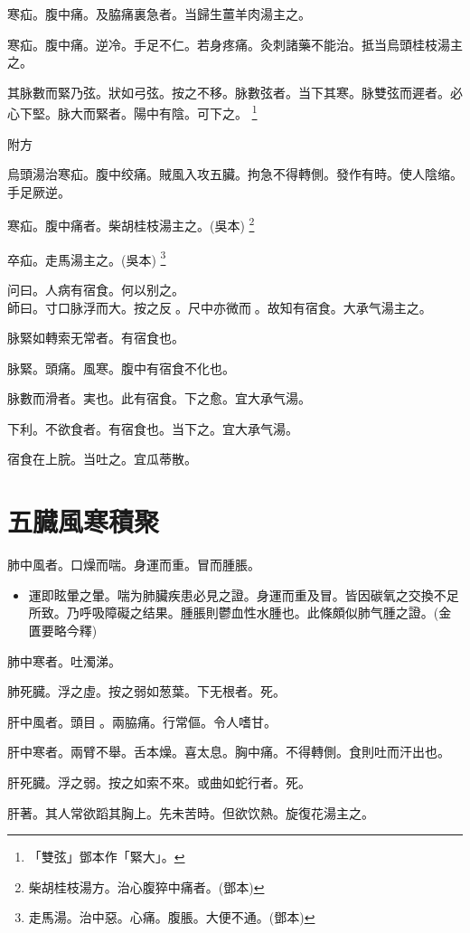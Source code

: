 \documentclass[11pt,oneside,b5paper]{ctexbook}
\begin{document}
\begin{flushleft}
寒疝。腹中痛。及脇痛裏急者。当歸生薑羊肉湯主之。

寒疝。腹中痛。逆冷。手足不仁。若身疼痛。灸刺諸藥不能治。抵当烏頭桂枝湯主之。

其脉數而緊乃弦。狀如弓弦。按之不移。脉數弦者。当下其寒。脉雙弦而遲者。必心下堅。脉大而緊者。陽中有陰。可下之。
\footnote{「雙弦」鄧本作「緊大」。}

附方

烏頭湯治寒疝。腹中绞痛。賊風入攻五臟。拘急不得轉側。發作有時。使人陰缩。手足厥逆。

寒疝。腹中痛者。柴胡桂枝湯主之。(吳本)
\footnote{柴胡桂枝湯方。治心腹猝中痛者。(鄧本)}

卒疝。走馬湯主之。(吳本)
\footnote{走馬湯。治中惡。心痛。腹脹。大便不通。(鄧本)}

问曰。人病有宿食。何以别之。\\
師曰。寸口脉浮而大。按之反{𬈧}。尺中亦微而{𬈧}。故知有宿食。大承气湯主之。

脉緊如轉索无常者。有宿食也。

脉緊。頭痛。風寒。腹中有宿食不化也。

脉數而滑者。実也。此有宿食。下之愈。宜大承气湯。

下利。不欲食者。有宿食也。当下之。宜大承气湯。

宿食在上脘。当吐之。宜瓜蒂散。

\chapter{五臓風寒積聚}

肺中風者。口燥而喘。身運而重。冒而腫脹。

\begin{itemize}
\item 運即眩暈之暈。喘为肺臟疾患必見之證。身運而重及冒。皆因碳氧之交換不足所致。乃呼吸障礙之结果。腫脹則鬱血性水腫也。此條頗似肺气腫之證。(金匱要略今釋)
\end{itemize}

肺中寒者。吐濁涕。

肺死臓。浮之虛。按之弱如葱葉。下无根者。死。

肝中風者。頭目{𥆧}。兩脇痛。行常傴。令人嗜甘。

肝中寒者。兩臂不舉。舌本燥。喜太息。胸中痛。不得轉側。食則吐而汗出也。

肝死臓。浮之弱。按之如索不來。或曲如蛇行者。死。

肝著。其人常欲蹈其胸上。先未苦時。但欲饮熱。旋復花湯主之。


\end{flushleft}
\end{document}
